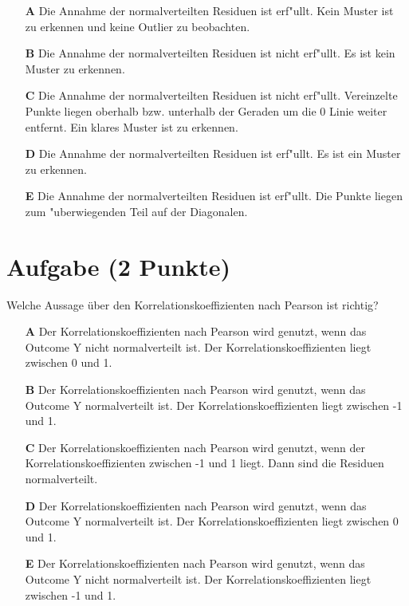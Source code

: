 \documentclass[a4paper, 9pt]{scrartcl}\usepackage[]{graphicx}\usepackage[]{xcolor}
\begin{document}
\begin{enumerate}
\item [\textbf{A} \msquare] Die Annahme der normalverteilten Residuen ist erf{"u}llt. Kein Muster ist zu erkennen und keine Outlier zu beobachten.
\item [\textbf{B} \msquare] Die Annahme der normalverteilten Residuen ist nicht erf{"u}llt. Es ist kein Muster zu erkennen.
\item [\textbf{C} \msquare] Die Annahme der normalverteilten Residuen ist nicht erf{"u}llt. Vereinzelte Punkte liegen oberhalb bzw. unterhalb der Geraden um die 0 Linie weiter entfernt. Ein klares Muster ist zu erkennen.
\item [\textbf{D} \msquare] Die Annahme der normalverteilten Residuen ist erf{"u}llt. Es ist ein Muster zu erkennen.
\item [\textbf{E} \msquare] Die Annahme der normalverteilten Residuen ist erf{"u}llt. Die Punkte liegen zum {"u}berwiegenden Teil auf der Diagonalen.
\end{enumerate}

\section{Aufgabe \hfill (2 Punkte)}




Welche Aussage {\"u}ber den Korrelationskoeffizienten nach Pearson
ist richtig?



\begin{enumerate}
\item [\textbf{A} \msquare] Der Korrelationskoeffizienten nach Pearson wird genutzt, wenn das Outcome Y nicht normalverteilt ist. Der Korrelationskoeffizienten liegt zwischen 0 und 1.
\item [\textbf{B} \msquare] Der Korrelationskoeffizienten nach Pearson wird genutzt, wenn das Outcome Y normalverteilt ist. Der Korrelationskoeffizienten liegt zwischen -1 und 1.
\item [\textbf{C} \msquare] Der Korrelationskoeffizienten nach Pearson wird genutzt, wenn der Korrelationskoeffizienten zwischen -1 und 1 liegt. Dann sind die Residuen normalverteilt.
\item [\textbf{D} \msquare] Der Korrelationskoeffizienten nach Pearson wird genutzt, wenn das Outcome Y normalverteilt ist. Der Korrelationskoeffizienten liegt zwischen 0 und 1.
\item [\textbf{E} \msquare] Der Korrelationskoeffizienten nach Pearson wird genutzt, wenn das Outcome Y nicht normalverteilt ist. Der Korrelationskoeffizienten liegt zwischen -1 und 1.
\end{enumerate}
\end{document}
